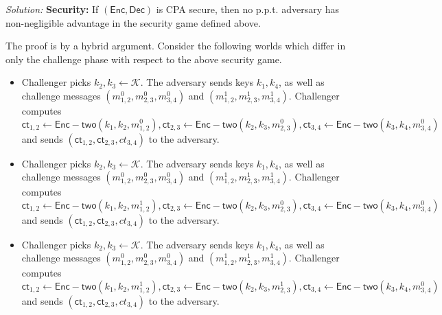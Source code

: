 \documentclass[a4paper, 11pt]{article}
\newenvironment{solution}
    {\textit{Solution:}}
    {\clearpage}
\newcommand{\ct}{\mathsf{ct}}
\newcommand{\enc}{\mathsf{Enc}}
\newcommand{\enct}{\mathsf{Enc-two}}
\newcommand{\dec}{\mathsf{Dec}}
\newcommand{\calK}{\mathcal{K}}
\begin{document}
\begin{solution}
    \noindent\textbf{Security:} If $(\enc,\dec)$ is CPA secure, then no p.p.t. adversary has non-negligible advantage in the security game defined above.

    The proof is by a hybrid argument. Consider the following worlds which differ in only the challenge phase with respect to the above security game.
    \clearpage
    \begin{world}[World 0]
        \begin{itemize}
            \item Challenger picks $k_2, k_3 \gets \calK$. The adversary sends keys $k_1, k_4$, as well as challenge messages $(m^0_{1,2}, m^0_{2,3},m^0_{3,4})$ and $(m^1_{1,2}, m^1_{2,3},m^1_{3,4})$. Challenger computes
                  $$\ct_{1,2} \gets \enct(k_1, k_2, m^0_{1,2}),\ct_{2,3} \gets \enct(k_2, k_3, m^0_{2,3}),\ct_{3,4} \gets \enct(k_3, k_4, m^0_{3,4})$$ and sends $(\ct_{1,2},\ct_{2,3},ct_{3,4})$ to the adversary.
        \end{itemize}
    \end{world}

    \begin{world}
        \begin{itemize}
            \item Challenger picks $k_2, k_3 \gets \calK$. The adversary sends keys $k_1, k_4$, as well as challenge messages $(m^0_{1,2}, m^0_{2,3},m^0_{3,4})$ and $(m^1_{1,2}, m^1_{2,3},m^1_{3,4})$. Challenger computes
                  $$\ct_{1,2} \gets \enct(k_1, k_2, m^1_{1,2}),\ct_{2,3} \gets \enct(k_2, k_3, m^0_{2,3}),\ct_{3,4} \gets \enct(k_3, k_4, m^0_{3,4})$$ and sends $(\ct_{1,2},\ct_{2,3},ct_{3,4})$ to the adversary.
        \end{itemize}
    \end{world}

    \begin{world}
        \begin{itemize}
            \item Challenger picks $k_2, k_3 \gets \calK$. The adversary sends keys $k_1, k_4$, as well as challenge messages $(m^0_{1,2}, m^0_{2,3},m^0_{3,4})$ and $(m^1_{1,2}, m^1_{2,3},m^1_{3,4})$. Challenger computes
                  $$\ct_{1,2} \gets \enct(k_1, k_2, m^1_{1,2}),\ct_{2,3} \gets \enct(k_2, k_3, m^1_{2,3}),\ct_{3,4} \gets \enct(k_3, k_4, m^0_{3,4})$$ and sends $(\ct_{1,2},\ct_{2,3},ct_{3,4})$ to the adversary.
        \end{itemize}
    \end{world}


\end{solution}
\end{document}
